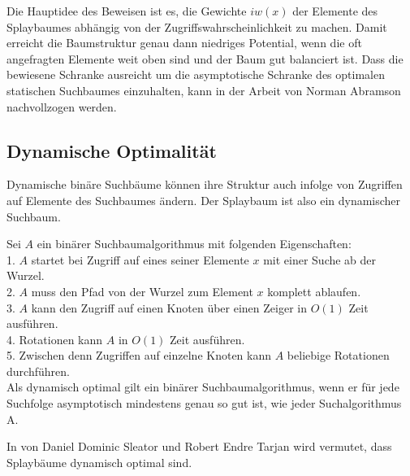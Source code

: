 \documentclass[11pt, a4paper]{article}
\begin{document}
\noindent Die Hauptidee des Beweisen ist es, die Gewichte $iw(x)$ der Elemente des Splaybaumes abhängig von der Zugriffswahrscheinlichkeit zu machen. Damit erreicht die Baumstruktur genau dann niedriges Potential, wenn die oft angefragten Elemente weit oben sind und der Baum gut balanciert ist. Dass die bewiesene Schranke ausreicht um die asymptotische Schranke des optimalen statischen Suchbaumes einzuhalten, kann in der Arbeit \cite{ab} von Norman Abramson nachvollzogen werden.

 
 
 \subsection{Dynamische Optimalität}
Dynamische binäre Suchbäume können ihre Struktur auch infolge von Zugriffen auf Elemente des Suchbaumes ändern. Der Splaybaum ist also ein dynamischer Suchbaum.

\noindent Sei $A$ ein binärer Suchbaumalgorithmus mit folgenden Eigenschaften:\\
1. $A$ startet bei Zugriff auf eines seiner Elemente $x$ mit einer Suche ab der Wurzel.\\
2. $A$ muss den Pfad von der Wurzel zum Element $x$ komplett ablaufen.\\
3. $A$ kann den Zugriff auf einen Knoten über einen Zeiger in $O(1)$ Zeit ausführen.\\
4. Rotationen kann $A$ in $O(1)$ Zeit ausführen.\\
5. Zwischen denn Zugriffen auf einzelne Knoten kann $A$ beliebige Rotationen durchführen.\\



\noindent Als dynamisch optimal gilt ein binärer Suchbaumalgorithmus, wenn er für jede Suchfolge asymptotisch mindestens genau so gut ist, wie jeder Suchalgorithmus A. 

\noindent In \cite{sl2} von Daniel Dominic Sleator und  Robert Endre Tarjan wird vermutet, dass Splaybäume dynamisch optimal sind.






\end{document}
